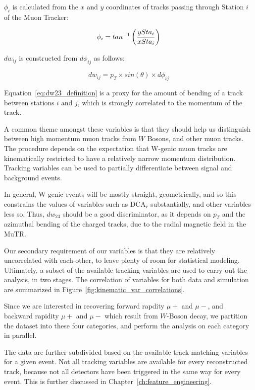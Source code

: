 \noindent$\phi_{i}$ is calculated from the $x$ and $y$ coordinates of tracks
passing through Station $i$ of the Muon Tracker:

\begin{equation}
  \phi_i = tan^{-1}\left({ySta_i \over xSta_i}\right)
  \label{eq:phi_definition}
\end{equation}

\noindent$dw_{ij}$ is constructed from $d\phi_{ij}$ as follows:

\begin{equation}
  dw_{ij} = p_T \times sin(\theta) \times d\phi_{ij}
  \label{eq:dw23_definition}
\end{equation}

{\noindent}Equation~\ref{eq:dw23_definition} is a proxy for the amount of
bending of a track between stations $i$ and $j$, which is strongly correlated to
the momentum of the track. 

A common theme amongst these variables is that they should help us distinguish
between high momentum muon tracks from $W$ Bosons, and other muon tracks. The
procedure depends on the expectation that W-genic muon tracks are kinematically
restricted to have a relatively narrow momentum distribution. Tracking variables
can be used to partially differentiate between signal and background events.

In general, W-genic events will be mostly straight, geometrically, and so this
constrains the values of variables such as DCA${}_r$ substantially, and other
variables less so. Thus, $dw_{23}$ should be a good discriminator, as it depends
on $p_T$ and the azimuthal bending of the charged tracks, due to the radial
magnetic field in the MuTR.

Our secondary requirement of our variables is that they are relatively
uncorrelated with each-other, to leave plenty of room for statistical modeling.
Ultimately, a subset of the available tracking variables are used to carry out
the analysis, in two stages. The correlation of variables for both data and
simulation are summarized in Figure~\ref{fig:kinematic_var_correlations}.

Since we are interested in recovering forward rapdity $\mu+$ and $\mu-$, and
backward rapidity $\mu+$ and $\mu-$ which result from $W$-Boson decay, we
partition the dataset into these four categories, and perform the analysis on
each category in parallel. 

The data are further subdivided based on the available track matching variables
for a given event. Not all tracking variables are available for every
reconstructed track, because not all detectors have been triggered in the same
way for every event. This is further discussed in
Chapter~\ref{ch:feature_engineering}.

